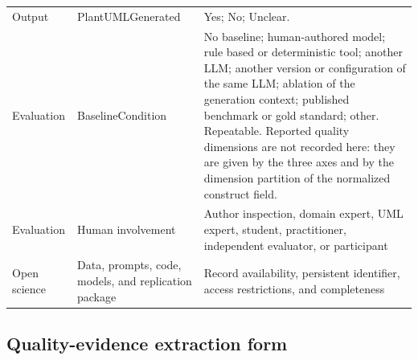 \begin{longtable}{p{} p{} p{}}
Output & PlantUMLGenerated & Yes; No; Unclear. \\
Evaluation & BaselineCondition & No baseline; human-authored model; rule based or deterministic tool; another LLM; another version or configuration of the same LLM; ablation of the generation context; published benchmark or gold standard; other. Repeatable. Reported quality dimensions are not recorded here: they are given by the three axes and by the dimension partition of the normalized construct field. \\
Evaluation & Human involvement & Author inspection, domain expert, UML expert, student, practitioner, independent evaluator, or participant \\
Open science & Data, prompts, code, models, and replication package & Record availability, persistent identifier, access restrictions, and completeness \\
\bottomrule
\end{longtable}

\subsection{Quality-evidence extraction form}


